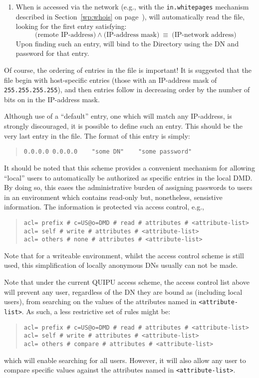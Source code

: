 \begin{enumerate}
\item	When  is accessed via the network
(e.g., with the \verb"in.whitepages" mechanism described in
Section~\ref{wp:whois} on page~\pageref{wp:whois}),
 will automatically read the  file,
looking for the first entry satisfying:
$$\mbox{(remote IP-address)} \land \mbox{(IP-address mask)}\ \equiv\ 
\mbox{(IP-network address)}$$
Upon finding such an entry,
 will bind to the Directory using the DN and password for that entry.
\end{enumerate}
Of course,
the ordering of entries in the  file is important!
It is suggested that the file begin with host-specific entries
(those with an IP-address mask of \verb"255.255.255.255"),
and then entries follow in decreasing order by the number of bits on in the
IP-address mask.

Although use of a ``default'' entry,
one which will match any IP-address,
is strongly discouraged,
it is possible to define such an entry.
This should be the very last entry in the  file.
The format of this entry is simply:
\begin{quote}\small\begin{verbatim}
0.0.0.0 0.0.0.0    "some DN"    "some password"
\end{verbatim}\end{quote}

It should be noted that this scheme provides a convenient mechanism for
allowing ``local'' users to automatically be authorized as specific entries in
the local DMD.
By doing so,
this eases the administrative burden of assigning passwords to users in an
environment which contains read-only but, nonetheless, sensistive information.
The information is protected via access control,
e.g.,
\begin{quote}\smaller\begin{verbatim}
acl= prefix # c=US@o=DMD # read # attributes # <attribute-list>
acl= self # write # attributes # <attribute-list>
acl= others # none # attributes # <attribute-list>
\end{verbatim}\end{quote}
Note that for a writeable environment,
whilst the access control scheme is still used,
this simplification of locally anonymous DNs usually can not be made.

Note that under the current QUIPU access scheme,
the access control list above will prevent any user,
regardless of the DN they are bound as (including local users),
from searching on the values of the attributes named in
\verb"<attribute-list>".
As such, a less restrictive set of rules might be:
\begin{quote}\smaller\begin{verbatim}
acl= prefix # c=US@o=DMD # read # attributes # <attribute-list>
acl= self # write # attributes # <attribute-list>
acl= others # compare # attributes # <attribute-list>
\end{verbatim}\end{quote}
which will enable searching for all users.
However,
it will also allow any user to compare specific values against the attributes
named in \verb"<attribute-list>".

